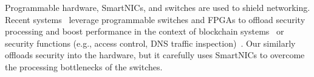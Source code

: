 
 Programmable hardware, SmartNICs, and switches are used to shield networking. Recent systems~\cite{10.1145/3603269.3604874, 10.1145/3620678.3624786, 10.1145/3563647.3563654, 10.1145/3321408.3323087, 278292} leverage programmable switches and FPGAs to offload security processing and boost performance in the context of blockchain systems~\cite{10.1145/3603269.3604874} or security functions (e.g., access control, DNS traffic inspection)~\cite{10.1145/3620678.3624786, 10.1145/3563647.3563654, 10.1145/3321408.3323087}. Our \projecttitle{} similarly offloads security into the hardware, but it carefully uses SmartNICs to overcome the processing bottlenecks of the switches. 






